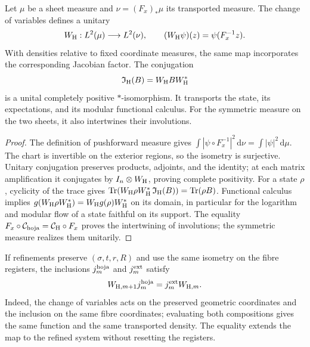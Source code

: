 \begin{proposition}
\label{vii:prop:transporte-unitario-horizonte}
Let \(\mu\) be a sheet measure and \(\nu=(F_x)_*\mu\) its
transported measure. The change of variables defines a unitary
\begin{equation}
 W_{\rm H}:L^2(\mu)\longrightarrow L^2(\nu),\qquad
 (W_{\rm H}\psi)(z)=\psi(F_x^{-1}z).
 \label{vii:eq:unitaria-horizonte}
\end{equation}
With densities relative to fixed coordinate measures, the same
map incorporates the corresponding Jacobian factor.
The conjugation
\begin{equation}
 \mathfrak I_{\rm H}(B)=W_{\rm H}BW_{\rm H}^*
 \label{vii:eq:mapa-observables-horizonte}
\end{equation}
is a unital completely positive \(*\)-isomorphism. It transports the
state, its expectations, and its modular functional calculus. For the symmetric
measure on the two sheets, it also intertwines their involutions.
\end{proposition}
\begin{proof}
The definition of pushforward measure gives
\(\int|\psi\circ F_x^{-1}|^2\,\mathrm d\nu
=\int|\psi|^2\,\mathrm d\mu\).
The chart is invertible on the exterior regions, so the isometry is
surjective. Unitary conjugation preserves products, adjoints, and
the identity; at each matrix amplification it conjugates by
\(I_n\otimes W_{\rm H}\), proving complete positivity.
For a state \(\rho\), cyclicity of the trace gives
\(\operatorname{Tr}(W_{\rm H}\rho W_{\rm H}^*
\,\mathfrak I_{\rm H}(B))=\operatorname{Tr}(\rho B)\).
Functional calculus implies
\(g(W_{\rm H}\rho W_{\rm H}^*)=W_{\rm H}g(\rho)W_{\rm H}^*\)
on its domain, in particular for the logarithm and modular flow of
a state faithful on its support. The equality
\(F_x\circ\mathcal C_{\rm hoja}=\mathcal C_{\rm H}\circ F_x\)
proves the intertwining of involutions; the symmetric measure realizes them
unitarily.
\end{proof}

\pagebreak %
If refinements preserve \((\sigma,t,r,R)\) and use the same
isometry on the fibre registers, the inclusions
\(j_m^{\rm hoja}\) and \(j_m^{\rm ext}\) satisfy
\begin{equation}
 W_{{\rm H},m+1}j_m^{\rm hoja}
 =j_m^{\rm ext}W_{{\rm H},m}.
 \label{vii:eq:naturalidad-horizonte}
\end{equation}
Indeed, the change of variables acts on the preserved geometric coordinates
and the inclusion on the same fibre coordinates; evaluating
both compositions gives the same function and the same transported density.
The equality extends the map to the refined system without resetting the registers.

